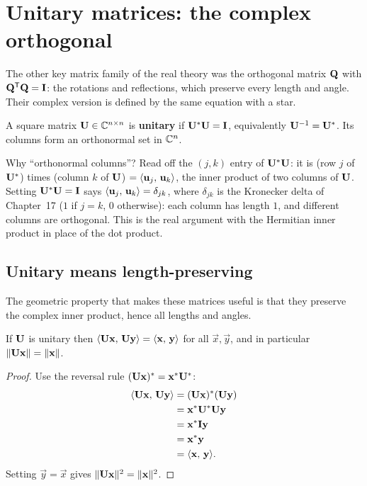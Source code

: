 \section{Unitary matrices: the complex orthogonal}

The other key matrix family of the real theory was the orthogonal matrix $\mathbf{Q}$
with $\mathbf{Q}^{\mathsf{T}}\mathbf{Q}=\mathbf{I}$: the rotations and reflections, which preserve every
length and angle. Their complex version is defined by the same equation with a
star.

\begin{definition}\label{ch32:unitarydef}
A square matrix $\mathbf{U}\in\mathbb{C}^{n\times n}$ is \textbf{unitary} if
$\mathbf{U}^{*}\mathbf{U} = \mathbf{I}$, equivalently $\mathbf{U}^{-1} = \mathbf{U}^{*}$. Its columns
form an orthonormal set in $\mathbb{C}^n$.
\end{definition}

Why ``orthonormal columns''? Read off the $(j,k)$ entry of $\mathbf{U}^{*}\mathbf{U}$: it
is (row $j$ of $\mathbf{U}^{*}$) times (column $k$ of $\mathbf{U}$) $=
\langle \mathbf{u}_j,\, \mathbf{u}_k \rangle$, the inner product of two columns of $\mathbf{U}$.
Setting $\mathbf{U}^{*}\mathbf{U}=\mathbf{I}$ says $\langle \mathbf{u}_j,\, \mathbf{u}_k \rangle = \delta_{jk}$,
where $\delta_{jk}$ is the Kronecker delta of Chapter~17 ($1$ if $j=k$, $0$
otherwise): each column has length $1$, and different columns are orthogonal.
This is the real argument with the Hermitian inner product in place of the dot
product.

\subsection{Unitary means length-preserving}

The geometric property that makes these matrices useful is that they
preserve the complex inner product, hence all lengths and angles.

\begin{theorem}\label{ch32:unitarynorm}
If $\mathbf{U}$ is unitary then $\langle \mathbf{U}\mathbf{x},\, \mathbf{U}\mathbf{y} \rangle =
\langle \mathbf{x},\, \mathbf{y} \rangle$ for all $\vec x,\vec y$, and in particular
$\lVert\mathbf{U}\mathbf{x}\rVert = \lVert\mathbf{x}\rVert$.
\end{theorem}

\begin{proof}
Use the reversal rule $(\mathbf{U}\mathbf{x})^{*}=\mathbf{x}^{*}\mathbf{U}^{*}$:
\begin{align*}
  \langle \mathbf{U}\mathbf{x},\, \mathbf{U}\mathbf{y} \rangle &= (\mathbf{U}\mathbf{x})^{*}(\mathbf{U}\mathbf{y}) \\
  &= \mathbf{x}^{*}\mathbf{U}^{*}\mathbf{U}\mathbf{y} \\
  &= \mathbf{x}^{*}\mathbf{I}\mathbf{y} \\
  &= \mathbf{x}^{*}\mathbf{y} \\
  &= \langle \mathbf{x},\, \mathbf{y} \rangle.
\end{align*}
Setting $\vec y=\vec x$ gives $\lVert\mathbf{U}\mathbf{x}\rVert^2 = \lVert\mathbf{x}\rVert^2$.
\end{proof}

